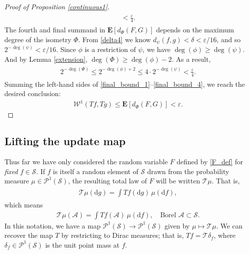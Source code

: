 \documentclass[11pt,reqno]{amsart}
\numberwithin{equation}{section}
\theoremstyle{definition}
\begin{document}
\begin{proof}[Proof of Proposition \ref{continuous1}]
{\begin{align}
\begin{split}
{< \frac{\varepsilon}{4}. \label{final_bound_3}
} \end{split} \end{align}}
The fourth and final summand in ${\mathbf{E}}[d_\Phi(F,G)]$ depends on the maximum degree of the isometry $\Phi$.
From \eqref{delta4} we know $d_\psi(f,g) < \delta < {\varepsilon}/16$, and so
$2^{-\deg(\psi)} < {\varepsilon}/16$.
Since $\phi$ is a restriction of $\psi$, we have $\deg(\phi) \geq \deg(\psi)$.
And by Lemma \ref{extension}, $\deg(\Phi) \geq \deg(\phi) - 2$.
As a result,
{\begin{align} \begin{split} {
2^{-\deg(\Phi)} \leq 2^{-\deg(\phi)+2} \leq 4 \cdot 2^{-\deg(\psi)} < \frac{\varepsilon}{4} \label{final_bound_4}.
} \end{split} \end{align}}
Summing the left-hand sides of \eqref{final_bound_1}--\eqref{final_bound_4}, we reach the desired conclusion:
{\begin{align*} {
{\mathcal{W}}^1(Tf,Tg) \leq {\mathbf{E}}[d_\Phi(F,G)] < {\varepsilon}.
} \end{align*}}
\end{proof}

\subsection{Lifting the update map} \label{extension_to_measures}
Thus far we have only considered the random variable $F$ defined by \eqref{F_def} for \textit{fixed} $f \in {\mathcal{S}}$.
If $f$ is itself a random element of ${\mathcal{S}}$ drawn from the probability measure $\mu \in {\mathcal{P}}^1({\mathcal{S}})$, the resulting total law of $F$ will be written ${\mathcal{T}}\mu$.
That is,
{\begin{align} \begin{split} {
{\mathcal{T}}\mu({\mathrm{d}} g) = \int Tf({\mathrm{d}} g)\, \mu({\mathrm{d}} f), \label{t_on_measures}
} \end{split} \end{align}}
which means
{\begin{align*} {
{\mathcal{T}}\mu({\mathcal{A}}) = \int Tf({\mathcal{A}})\ \mu({\mathrm{d}} f), \quad \text{Borel ${\mathcal{A}} \subset {\mathcal{S}}$}.
} \end{align*}}
In this notation, we have a map ${\mathcal{P}}^1({\mathcal{S}}) \to {\mathcal{P}}^1({\mathcal{S}})$ given by $\mu \mapsto {\mathcal{T}}\mu$.
We can recover the map $T$ by restricting to Dirac measures;
that is, $Tf = {\mathcal{T}}\delta_f$, where $\delta_f \in {\mathcal{P}}^1({\mathcal{S}})$ is the unit point mass at $f$.
\end{document}
